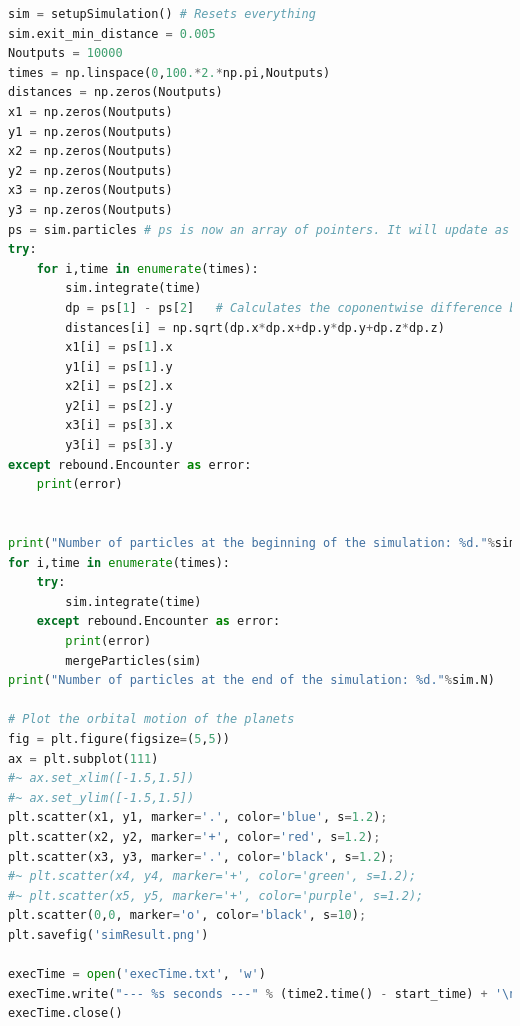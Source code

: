 \documentclass[12pt]{report}
\begin{document}
\begin{appendix}
\begin{lstlisting}[language=Python]
sim = setupSimulation() # Resets everything
sim.exit_min_distance = 0.005
Noutputs = 10000
times = np.linspace(0,100.*2.*np.pi,Noutputs)
distances = np.zeros(Noutputs)
x1 = np.zeros(Noutputs)
y1 = np.zeros(Noutputs)
x2 = np.zeros(Noutputs)
y2 = np.zeros(Noutputs)
x3 = np.zeros(Noutputs)
y3 = np.zeros(Noutputs)
ps = sim.particles # ps is now an array of pointers. It will update as the simulation runs.
try:
    for i,time in enumerate(times):
		sim.integrate(time)
		dp = ps[1] - ps[2]   # Calculates the coponentwise difference between particles
		distances[i] = np.sqrt(dp.x*dp.x+dp.y*dp.y+dp.z*dp.z)
		x1[i] = ps[1].x
		y1[i] = ps[1].y
		x2[i] = ps[2].x
		y2[i] = ps[2].y
		x3[i] = ps[3].x
		y3[i] = ps[3].y
except rebound.Encounter as error:
    print(error)
    
    
print("Number of particles at the beginning of the simulation: %d."%sim.N)
for i,time in enumerate(times):
    try:
        sim.integrate(time)
    except rebound.Encounter as error:
        print(error)
        mergeParticles(sim)
print("Number of particles at the end of the simulation: %d."%sim.N)

# Plot the orbital motion of the planets
fig = plt.figure(figsize=(5,5))
ax = plt.subplot(111)
#~ ax.set_xlim([-1.5,1.5])
#~ ax.set_ylim([-1.5,1.5])
plt.scatter(x1, y1, marker='.', color='blue', s=1.2);
plt.scatter(x2, y2, marker='+', color='red', s=1.2);
plt.scatter(x3, y3, marker='.', color='black', s=1.2);
#~ plt.scatter(x4, y4, marker='+', color='green', s=1.2);
#~ plt.scatter(x5, y5, marker='+', color='purple', s=1.2);
plt.scatter(0,0, marker='o', color='black', s=10);
plt.savefig('simResult.png')

execTime = open('execTime.txt', 'w')
execTime.write("--- %s seconds ---" % (time2.time() - start_time) + '\n')
execTime.close()
\end{lstlisting}
\end{appendix}
\fi
\end{document}

